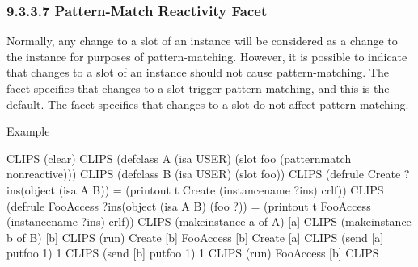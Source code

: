 \documentclass[letterpaper,10pt,english]{sphinxmanual}
\begin{document}
\begin{sphinxVerbatim}[commandchars=\\\{\}]
\end{sphinxVerbatim}


\subsubsection{9.3.3.7 Pattern-Match Reactivity Facet}
\label{\detokenize{cool:pattern-match-reactivity-facet}}
Normally, any change to a slot of an instance will be considered as a
change to the instance for purposes of pattern-matching. However, it is
possible to indicate that changes to a slot of an instance should not
cause pattern-matching. The  facet specifies that changes to
a slot trigger pattern-matching, and this is the default. The
 facet specifies that changes to a slot do not affect
pattern-matching.

Example

\begin{sphinxVerbatim}[commandchars=\\\{\}]
CLIPS\PYGZgt{} (clear)
CLIPS\PYGZgt{}
(defclass A (is\PYGZhy{}a USER)
  (slot foo (pattern\PYGZhy{}match non\PYGZhy{}reactive)))
CLIPS\PYGZgt{}
(defclass B (is\PYGZhy{}a USER)
  (slot foo))
CLIPS\PYGZgt{}
(defrule Create
  ?ins\PYGZlt{}\PYGZhy{}(object (is\PYGZhy{}a A \textbar{} B))
  =\PYGZgt{}
  (printout t \PYGZdq{}Create \PYGZdq{} (instance\PYGZhy{}name ?ins) crlf))
CLIPS\PYGZgt{}
(defrule Foo\PYGZhy{}Access
  ?ins\PYGZlt{}\PYGZhy{}(object (is\PYGZhy{}a A \textbar{} B) (foo ?))
  =\PYGZgt{}
  (printout t \PYGZdq{}Foo\PYGZhy{}Access \PYGZdq{} (instance\PYGZhy{}name ?ins) crlf))
CLIPS\PYGZgt{} (make\PYGZhy{}instance a of A)
[a]
CLIPS\PYGZgt{} (make\PYGZhy{}instance b of B)
[b]
CLIPS\PYGZgt{} (run)
Create [b]
Foo\PYGZhy{}Access [b]
Create [a]
CLIPS\PYGZgt{} (send [a] put\PYGZhy{}foo 1)
1
CLIPS\PYGZgt{} (send [b] put\PYGZhy{}foo 1)
1
CLIPS\PYGZgt{} (run)
Foo\PYGZhy{}Access [b]
CLIPS\PYGZgt{}
\end{sphinxVerbatim}
\end{document}

